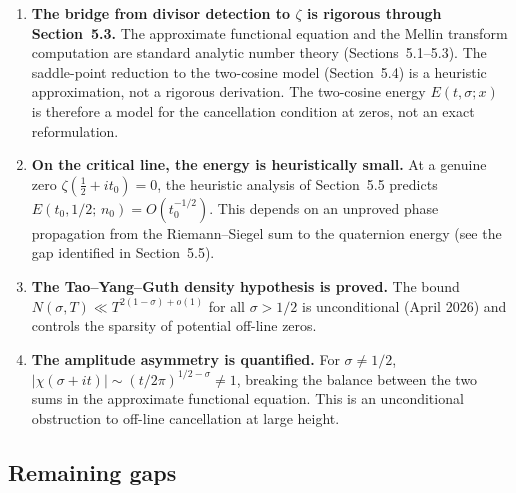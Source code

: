 \documentclass[12pt,a4paper]{article}
\begin{document}
\begin{enumerate}[label=\textbf{\arabic*.}]
\item \textbf{The bridge from divisor detection to $\zeta$ is rigorous through Section~5.3.} The approximate functional equation and the Mellin transform computation are standard analytic number theory (Sections~5.1--5.3). The saddle-point reduction to the two-cosine model (Section~5.4) is a heuristic approximation, not a rigorous derivation. The two-cosine energy $E(t,\sigma;x)$ is therefore a model for the cancellation condition at zeros, not an exact reformulation.
\item \textbf{On the critical line, the energy is heuristically small.} At a genuine zero $\zeta(\tfrac12+it_0) = 0$, the heuristic analysis of Section~5.5 predicts $E(t_0,1/2;\,n_0) = O(t_0^{-1/2})$. This depends on an unproved phase propagation from the Riemann--Siegel sum to the quaternion energy (see the gap identified in Section~5.5).
\item \textbf{The Tao--Yang--Guth density hypothesis is proved.} The bound $N(\sigma,T) \ll T^{2(1-\sigma)+o(1)}$ for all $\sigma > 1/2$ is unconditional (April 2026) and controls the sparsity of potential off-line zeros.
\item \textbf{The amplitude asymmetry is quantified.} For $\sigma \neq 1/2$, $|\chi(\sigma+it)| \sim (t/2\pi)^{1/2-\sigma} \neq 1$, breaking the balance between the two sums in the approximate functional equation. This is an unconditional obstruction to off-line cancellation at large height.
\end{enumerate}

\subsection{Remaining gaps}
\end{document}
